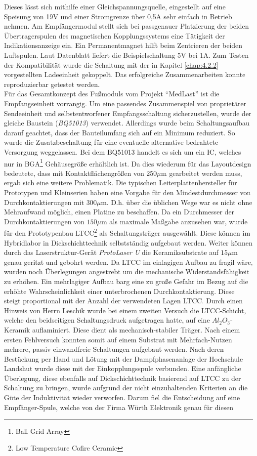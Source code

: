 \documentclass[12pt]{scrreprt} %
\begin{document}
Dieses lässt sich mithilfe einer Gleichspannungsquelle, eingestellt auf eine Speisung von 19V und einer Stromgrenze über 0,5A sehr einfach in Betrieb nehmen. Am Empfängermodul stellt sich bei passgenauer Platzierung der beiden Übertragerspulen des magnetischen Kopplungssystems eine Tätigkeit der Indikationsanzeige ein. Ein Permanentmagnet hilft beim Zentrieren der beiden Luftspulen. Laut Datenblatt \citep[vgl. S.2]{bq51013EVM-725} liefert die Beispielschaltung 5V bei 1A. Zum Testen der Kompatibilität wurde die Schaltung mit der in Kapitel \ref{chap:4.2.2} vorgestellten Ladeeinheit gekoppelt. Das erfolgreiche Zusammenarbeiten konnte reproduzierbar getestet werden.\\
Für das Gesamtkonzept des Fußmoduls vom Projekt "`MedLast"' ist die Empfangseinheit vorrangig. Um eine passendes Zusammenspiel von proprietärer Sendeeinheit und selbstentworfener Empfangsschaltung sicherzustellen, wurde der gleiche Baustein (\textit{BQ51013}) verwendet. Allerdings wurde beim Schaltungsaufbau darauf geachtet, dass der Bauteilumfang sich auf ein Minimum reduziert. So wurde die Zusatzbeschaltung für eine eventuelle alternative bedrahtete Versorgung weggelassen. Bei dem BQ51013 handelt es sich um ein IC, welches nur in BGA\footnote{Ball Grid Array} Gehäusegröße erhältlich ist. Da dies wiederum für das Layoutdesign bedeutete, dass mit Kontaktflächengrößen von $250\mu$m gearbeitet werden muss, ergab sich eine weitere Problematik. Die typischen Leiterplattenhersteller für Prototypen und Kleinserien haben eine Vorgabe für den Mindestdurchmesser von Durchkontaktierungen mit $300\mu$m. D.h. über die üblichen Wege war es nicht ohne Mehraufwand möglich, einen Platine zu beschaffen. Da ein Durchmesser der Durchkontaktierungen von $150\mu$m als maximale Maßgabe anzusehen war, wurde für den Prototypenbau LTCC\footnote{Low Temperature Cofire Ceramic} als Schaltungsträger ausgewählt. Diese können im Hybridlabor in Dickschichttechnik selbstständig aufgebaut werden. Weiter können durch das Laserstruktur-Gerät \textit{ProtoLaser U} die Keramiksubstrate auf $15\mu$m genau geritzt und gebohrt werden.  Da LTCC im einlagigen Aufbau zu fragil wäre, wurden noch Überlegungen angestrebt um die mechanische Widerstandsfähigkeit zu erhöhen. Ein mehrlagiger Aufbau barg eine zu große Gefahr im Bezug auf die erhöhte Wahrscheinlichkeit einer unterbrochenen Durchkontaktierung. Diese steigt proportional mit der Anzahl der verwendeten Lagen LTCC. Durch einen Hinweis von Herrn Leschik wurde bei einem zweiten Versuch die LTCC-Schicht, welche den beidseitigen Schaltungsdruck aufgetragen hatte, auf eine $Al_2O_3$-Keramik auflaminiert. Diese dient als mechanisch-stabiler Träger. Nach einem ersten Fehlversuch konnten somit auf einem Substrat mit Mehrfach-Nutzen mehrere, passiv einwandfreie Schaltungen aufgebaut werden. Nach deren Bestückung per Hand und Lötung mit der Dampfphasenanlage der Hochschule Landshut wurde diese mit der Einkopplungsspule verbunden. Eine anfängliche Überlegung, diese ebenfalls auf Dickschichttechnik basierend auf LTCC zu der Schaltung zu bringen, wurde aufgrund der nicht einzuhaltenden Kriterien an die Güte der Induktivität wieder verworfen. Darum fiel die Entscheidung auf eine Empfänger-Spule, welche von der Firma Würth Elektronik genau für diesen 
\end{document}
